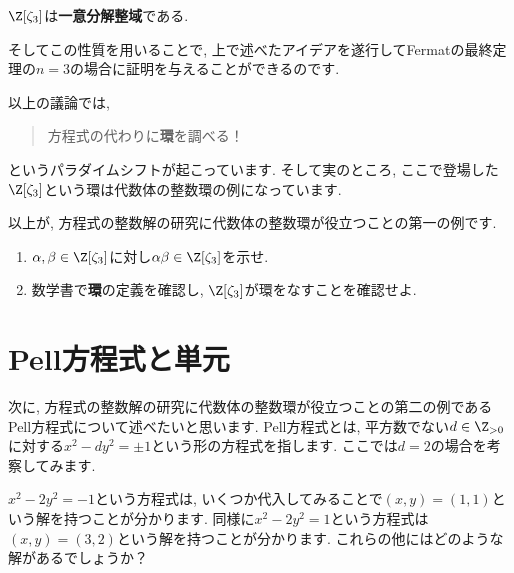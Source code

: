 \documentclass[11pt,b5paper,oneside,titlepage,lualatex]{ltjsreport}
\begin{document}
\begin{thm}{\cite[定理8.6.1]{Yukie1}}{}
	$ \Z[\zeta_3] $は\textbf{一意分解整域}である.
\end{thm}

そしてこの性質を用いることで, 上で述べたアイデアを遂行してFermatの最終定理の$ n=3 $の場合に証明を与えることができるのです. 

以上の議論では, 
\begin{quote}
	\centering
	方程式の代わりに\textbf{環}を調べる！
\end{quote}
というパラダイムシフトが起こっています. 
そして実のところ, ここで登場した$ \Z[\zeta_3] $という環は代数体の整数環の例になっています. 

以上が, 方程式の整数解の研究に代数体の整数環が役立つことの第一の例です. 

\begin{exc}{}{}
	\begin{enumerate}
		\item $ \alpha, \beta \in \Z[\zeta_3] $に対し$ \alpha \beta \in \Z[\zeta_3] $を示せ. 
		\item 数学書で\textbf{環}の定義を確認し, $ \Z[\zeta_3] $が環をなすことを確認せよ. 
	\end{enumerate}
\end{exc}


\section{Pell方程式と単元} \label{sec:Pell方程式と単元}


次に, 方程式の整数解の研究に代数体の整数環が役立つことの第二の例であるPell方程式について述べたいと思います. 
Pell方程式とは, 平方数でない$ d \in \Z_{>0} $に対する$ x^2 - dy^2 = \pm 1 $という形の方程式を指します. 
ここでは$ d = 2 $の場合を考察してみます. 

$ x^2 - 2y^2 = -1 $という方程式は, いくつか代入してみることで$ (x, y) = (1, 1) $という解を持つことが分かります. 
同様に$ x^2 - 2y^2 = 1 $という方程式は$ (x, y) = (3, 2) $という解を持つことが分かります. 
これらの他にはどのような解があるでしょうか？
\end{document}

